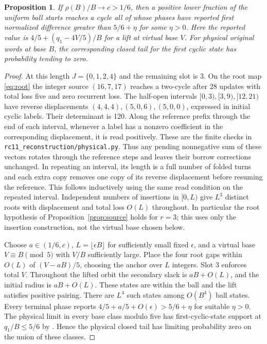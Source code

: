 \documentclass[11pt,reqno]{amsart}
\newtheorem{proposition}[theorem]{Proposition}
\theoremstyle{definition}
\newcommand{\file}[1]{\nolinkurl{#1}}
\begin{document}
\begin{proposition}\label{prop:ball}
If \(\rho(B)/B\to c>1/6\), then a positive lower fraction of the uniform ball starts reaches a cycle all of whose phases have reported first normalized difference greater than \(5/6+\eta\) for some \(\eta>0\). Here the reported value is \(4/5+(q_1-4V/5)/B\) for a lift at virtual base \(V\). For physical original words at base \(B\), the corresponding closed tail for the first cyclic state has probability tending to zero.
\end{proposition}
\begin{proof}
At this length \(J=\{0,1,2,4\}\) and the remaining slot is 3. On the root map \eqref{eq:root} the integer source \((16,7,17)\) reaches a two-cycle after 28 updates with total loss five and zero recurrent loss. The half-open intervals \([0,3),[3,9),[12,21)\) have reverse displacements \((4,4,4),(5,0,6),(5,0,0)\), expressed in initial cyclic labels. Their determinant is 120. Along the reference prefix through the end of each interval, whenever a label has a nonzero coefficient in the corresponding displacement, it is read positively. These are the finite checks in \file{rc11_reconstruction/physical.py}. Thus any pending nonnegative sum of these vectors rotates through the reference steps and leaves their borrow corrections unchanged. In repeating an interval, its length is a full number of folded turns and each extra copy removes one copy of its reverse displacement before resuming the reference. This follows inductively using the same read condition on the repeated interval. Independent numbers of insertions in \([0,L)\) give \(L^3\) distinct roots with displacement and total loss \(O(L)\) throughout. In particular the root hypothesis of Proposition~\ref{prop:source} holds for \(r=3\); this uses only the insertion construction, not the virtual base chosen below.

Choose \(a\in(1/6,c)\), \(L=\lfloor\epsilon B\rfloor\) for sufficiently small fixed \(\epsilon\), and a virtual base \(V\equiv B\pmod5\) with \(V/B\) sufficiently large. Place the four root gaps within \(O(L)\) of \((V-aB)/5\), choosing the anchor over \(L\) integers. Slot 3 enforces total \(V\). Throughout the lifted orbit the secondary slack is \(aB+O(L)\), and the initial radius is \(aB+O(L)\). These states are within the ball and the lift satisfies positive pairing. There are \(L^4\) such states among \(O(B^4)\) ball states. Every terminal phase reports \(4/5+a/5+O(\epsilon)>5/6+\eta\) for suitable \(\eta>0\). The physical limit in every base class modulo five has first-cyclic-state support at \(q_1/B\le5/6\) by \cite[Theorem~2 and its terminal tables]{G4}. Hence the physical closed tail has limiting probability zero on the union of these classes.
\end{proof}
\end{document}
